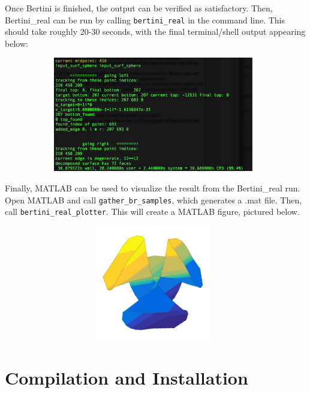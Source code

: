 \documentclass[10pt]{article}
\begin{document}
Once Bertini is finished, the output can be verified as satisfactory. Then, Bertini\_real can be run by calling \texttt{bertini\_real} in the command line. This should take roughly 20-30 seconds, with the final terminal/shell output appearing below:
\begin{figure}[!hb]
	\includegraphics[width = 11cm, height = 5cm]{CayleyCubicBertiniRealRun.png}
\end{figure}

Finally, MATLAB can be used to visualize the result from the Bertini\_real run. Open MATLAB and call \texttt{gather\_br\_samples}, which generates a .mat file. Then, call \texttt{bertini\_real\_plotter}. This will create a MATLAB figure, pictured below. 

\begin{figure}[!hb]
	\includegraphics[width = 11cm, height = 5cm]{CayleyCubic.png}
\end{figure}


\section{Compilation and Installation}
\label{sec:installation}
\end{document}
